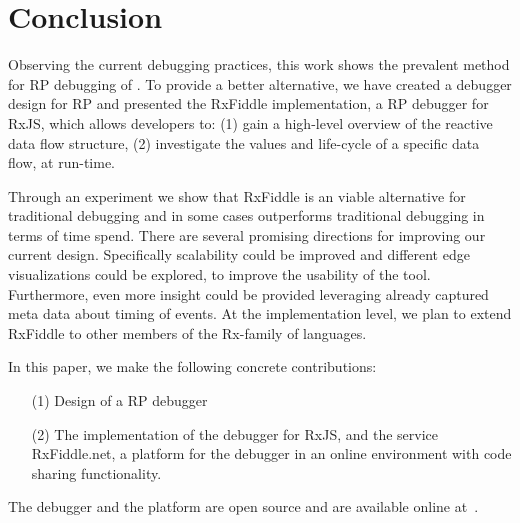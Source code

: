 \section{Conclusion}
Observing the current debugging practices, this work shows the prevalent method for RP debugging of \printfdebugging{}.
To provide a better alternative, we have created a debugger design for RP and presented the RxFiddle implementation, a RP debugger for RxJS, which allows developers to: (1) gain a high-level overview of the reactive data flow structure, (2) investigate the values and life-cycle of a specific data flow, at run-time.

Through an experiment we show that RxFiddle is an viable alternative for traditional debugging and in some cases outperforms traditional debugging in terms of time spend. There are several promising directions for improving our current design. 
Specifically scalability could be improved and different edge visualizations could be explored, to improve the usability of the tool. Furthermore, even more insight could be provided leveraging already captured meta data about timing of events. At the implementation level, we plan to extend RxFiddle to other members of the Rx-family of languages.

In this paper, we make the following concrete contributions:
\begin{itemize}
\item[(1)] Design of a RP debugger
\item[(2)] The implementation of the debugger for RxJS, and the service RxFiddle.net, a platform for the debugger in an online environment with code sharing functionality.
\end{itemize}

The debugger and the platform are open source and are available online at~\cite{rxfiddle-doi}.
